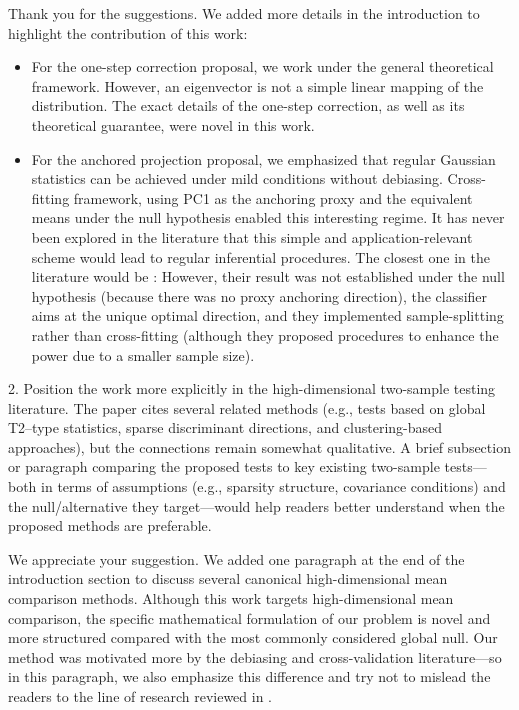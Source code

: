 \documentclass{article}
\theoremstyle{definition}
\begin{document}
Thank you for the suggestions. We added more details in the introduction to highlight the contribution of this work:

\begin{itemize}
    \item For the one-step correction proposal, we work under the general theoretical framework. However, an eigenvector is not a simple linear mapping of the distribution. The exact details of the one-step correction, as well as its theoretical guarantee, were novel in this work. 
    \item For the anchored projection proposal, we emphasized that regular Gaussian statistics can be achieved under mild conditions without debiasing. Cross-fitting framework, using PC1 as the anchoring proxy and the equivalent means under the null hypothesis enabled this interesting regime. It has never been explored in the literature that this simple and application-relevant scheme would lead to regular inferential procedures. The closest one in the literature would be \cite{liu2022multiple}: However, their result was not established under the null hypothesis (because there was no proxy anchoring direction), the classifier aims at the unique optimal direction, and they implemented sample-splitting rather than cross-fitting (although they proposed procedures to enhance the power due to a smaller sample size).
\end{itemize}

\begin{shaded}
2. Position the work more explicitly in the high-dimensional two-sample testing literature.
The paper cites several related methods (e.g., tests based on global T2–type statistics, sparse discriminant directions, and clustering-based approaches), but the connections remain somewhat qualitative. A brief subsection or paragraph comparing the proposed tests to key existing two-sample tests—both in terms of assumptions (e.g., sparsity structure, covariance conditions) and the null/alternative they target—would help readers better understand when the proposed methods are preferable.
\end{shaded}

We appreciate your suggestion. We added one paragraph at the end of the introduction section to discuss several canonical high-dimensional mean comparison methods. Although this work targets high-dimensional mean comparison, the specific mathematical formulation of our problem is novel and more structured compared with the most commonly considered global null. Our method was motivated more by the debiasing and cross-validation literature---so in this paragraph, we also emphasize this difference and try not to mislead the readers to the line of research reviewed in \cite{huang2022overview}.
\end{document}
